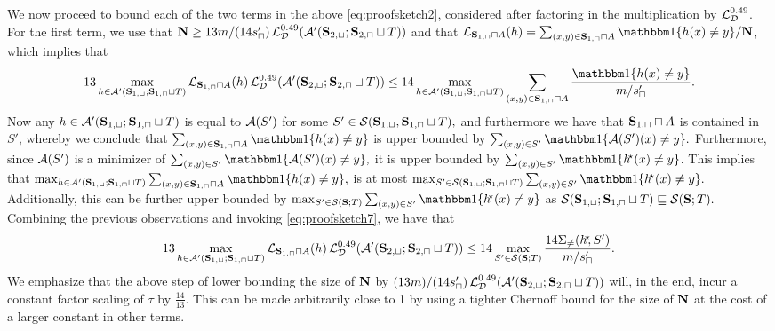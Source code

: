 We now proceed to bound each of the two terms in the above \cref{eq:proofsketch2}, considered after factoring in the multiplication by $\operatorname{\mathcal{L}}_{\mathcal{D}}^{0.49}$.
For the first term, we use that $ \mathbf{N}\geq 13m/(14s_{\sqcap}')\operatorname{\mathcal{L}}_{\mathcal{D}}^{0.49}(\mathcal{A}'(\mathbf{S}_{2,\sqcup};\mathbf{S}_{2,\sqcap}\sqcup T)) $ and that $ \ls_{\rS_{1,\sqcap}\sqcap A}(h)=\sum_{(x,y)\in\rS_{1,\sqcap}\sqcap A}\ind\{h(x)\not=y  \} /\rN $, which implies that 
\begin{align}\label{eq:proofsketch7}
    13\max_{h\in\cA'(\rS_{1,\sqcup};\rS_{1,\sqcap}\sqcup T)}  \ls_{\rS_{1,\sqcap}\sqcap A}(h)\ls_{\cD}^{0.49}(\cA'(\rS_{2,\sqcup};\rS_{2,\sqcap}\sqcup T)) \leq 14 \max_{h\in\cA'(\rS_{1,\sqcup};\rS_{1,\sqcap}\sqcup T)} \sum_{(x,y)\in\rS_{1,\sqcap}\sqcap A}\frac{\ind\{h(x)\not=y  \} }{m/s_{\sqcap}'}.
\end{align}
Now any $ h\in\mathcal{A}'(\mathbf{S}_{1,\sqcup};\mathbf{S}_{1,\sqcap}\sqcup T) $ is equal to $ \mathcal{A}(S') $ for some $ S'\in \mathcal{S}(\mathbf{S}_{1,\sqcup},\mathbf{S}_{1,\sqcap}\sqcup T),$ and furthermore we have that $ \mathbf{S}_{1,\sqcap}\sqcap A $ is contained in $ S' $, whereby we conclude that $ \sum_{(x,y)\in\rS_{1,\sqcap}\sqcap A}\ind\{h(x)\not=y  \} $ is upper bounded by $\sum_{(x,y)\in S'}\ind\{\cA(S')(x)\not=y  \} .$ 
Furthermore, since $ \mathcal{A}(S') $ is a minimizer of $ \sum_{(x,y)\in S'}\ind\{\cA(S')(x)\not=y  \},$ it is upper bounded by $ \sum_{(x,y)\in S'}\ind\{\hs(x)\not=y  \}$. This implies that $ \max_{h\in\cA'(\rS_{1,\sqcup};\rS_{1,\sqcap}\sqcup T)} \sum_{(x,y)\in\rS_{1,\sqcap}\sqcap A}\ind\{h(x)\not=y  \},$ is at most $ \max_{S'\in\cS(\rS_{1,\sqcup};\rS_{1,\sqcap}\sqcup T)} \sum_{(x,y)\in S'}\ind\{\hs(x)\not=y  \}.$ Additionally, this can be further upper bounded by $ \max_{S'\in\cS(\rS; T)}\sum_{(x,y)\in S'}\ind\{\hs(x)\not=y  \}$ as  $ \mathcal{S}(\mathbf{S}_{1,\sqcup};\mathbf{S}_{1,\sqcap}\sqcup T) \sqsubseteq \mathcal{S}(\mathbf{S};T).$ Combining the previous observations and invoking \cref{eq:proofsketch7}, we have that
\begin{align}\label{eq:proofsketch10}
    13\max_{h\in\mathcal{A}'(\mathbf{S}_{1,\sqcup};\mathbf{S}_{1,\sqcap}\sqcup T)}  \operatorname{\mathcal{L}}_{\mathbf{S}_{1,\sqcap}\sqcap A}(h)\operatorname{\mathcal{L}}_{\mathcal{D}}^{0.49}(\mathcal{A}'(\mathbf{S}_{2,\sqcup};\mathbf{S}_{2,\sqcap}\sqcup T)) \leq 14 \max\limits_{S'\in\mathcal{S}(\mathbf{S};T)}\frac{14\Sigma_{\not=}(h^{\negmedspace\star}\negmedspace,S')}{m/s_{\sqcap}'}.
\end{align}
We emphasize that the above step of lower bounding the size of $ \mathbf{N} $ by $ (13m)/(14s_{\sqcap}')\operatorname{\mathcal{L}}_{\mathcal{D}}^{0.49}(\mathcal{A}'(\mathbf{S}_{2,\sqcup};\mathbf{S}_{2,\sqcap}\sqcup T)) $ will, in the end, incur a constant factor scaling of $ \tau $ by $ \frac{14}{13}.$ This can be made arbitrarily close to 1 by using a tighter Chernoff bound for the size of $ \mathbf{N} $ at the cost of a larger constant
in other terms.

